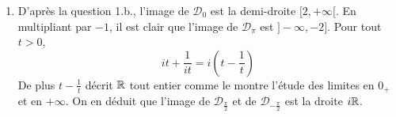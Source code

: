 \begin{enumerate}
\begin{enumerate}
 \item La forme réduite d'une équation d'hyberbole apparait.\newline
La courbe $\mathcal H_\theta$ est donc une branche d'hyperbole contenue dans le demi-plan $\frac{x}{\cos \theta}\geq 2$. Le centre est $O$, l'axe focal $Ox$, la distance centre-foyer est 
\begin{displaymath}
 \sqrt{(2\cos \theta)^2 + (2\sin \theta)^2}=2
\end{displaymath}
, les foyers sont les points de coordonnées $(-2,0)$ et $(2,0)$, l'excentricité est $e=\frac{c}{a}=\frac{1}{\cos \theta}$.\newline
Les asymptotes sont les droites d'équation
\begin{align*}
 \dfrac{x}{2\cos \theta}-\dfrac{y}{2\sin \theta} =0
 & \text{ et } &
 \dfrac{x}{2\cos \theta}+\dfrac{y}{2\sin \theta} =0
\end{align*}
Leurs vecteurs directeurs sont $\overrightarrow{e_\theta}$ et $\overrightarrow{e_{-\theta}}$.
 \item L'équation cartésienne de $\mathcal{H}_{\frac{\pi}{3}}$ est
\begin{displaymath}
 x^2 - \dfrac{y^2}{3}=1 
\end{displaymath}
avec $x\geq 1$.
\begin{figure}[ht]
 \centering

\caption{Branche d'hyperbole $\mathcal H_{\dfrac{\pi}{3}}$}
 \label{fig: Czuhobo_2}
\end{figure}
\end{enumerate}

\item D'après la question 1.b., l'image de $\mathcal D_0$ est la demi-droite $[2,+\infty[$.\newline
En multipliant par $-1$, il est clair que l'image de $\mathcal D_\pi$ est $]-\infty,-2].$\newline
Pour tout $t>0$,
\begin{displaymath}
 it + \dfrac{1}{it}= i \left( t-\dfrac{1}{t}\right) 
\end{displaymath}
De plus $t-\frac{1}{t}$ décrit $\mathbb{R}$ tout entier comme le montre l'étude des limites en $0_+$ et en $+\infty$. On en déduit que l'image de $\mathcal D_{\frac{\pi}{2}}$ et de $\mathcal D_{-\frac{\pi}{2}}$ est la droite $i\mathbb{R}$. 
\end{enumerate}

